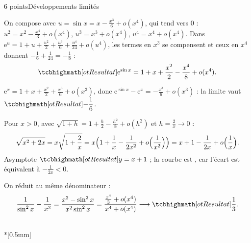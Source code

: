 

\begin{corrigeEval}{6 points}{Développements limités}
\begin{questions}
  \item On compose avec $u=\sin x=x-\frac{x^{3}}6+o(x^{4})$, qui tend vers
    $0$ : $u^{2}=x^{2}-\frac{x^{4}}3+o(x^{4})$, $u^{3}=x^{3}+o(x^{4})$,
    $u^{4}=x^{4}+o(x^{4})$. Dans
    $\mathrm{e}^{u}=1+u+\frac{u^{2}}2+\frac{u^{3}}6+\frac{u^{4}}{24}+o(u^{4})$,
    les termes en $x^{3}$ se compensent et ceux en $x^{4}$ donnent
    $-\frac16+\frac1{24}=-\frac18$ :
    \[\res{\mathrm{e}^{\sin x}=1+x+\frac{x^{2}}{2}-\frac{x^{4}}{8}+o(x^{4})}.\]
  \item $\mathrm{e}^{x}=1+x+\frac{x^{2}}2+\frac{x^{3}}6+o(x^{3})$, donc
    $\mathrm{e}^{\sin x}-\mathrm{e}^{x}=-\frac{x^{3}}6+o(x^{3})$ : la limite
    vaut $\res{-\dfrac16}$. \pts{1 pt}
  \item Pour $x>0$, avec $\sqrt{1+h}=1+\frac h2-\frac{h^{2}}8+o(h^{2})$ et
    $h=\frac2x\to0$ :
    \[\sqrt{x^{2}+2x}=x\sqrt{1+\frac2x}
      =x\Bigl(1+\frac1x-\frac{1}{2x^{2}}+o\Bigl(\frac{1}{x^{2}}\Bigr)\Bigr)
      =x+1-\frac{1}{2x}+o\Bigl(\frac1x\Bigr).\]
    Asymptote $\res{y=x+1}$ ; la courbe est , car
    l'écart est équivalent à $-\frac{1}{2x}<0$. 
  \item On réduit au même dénominateur :
    \[\frac{1}{\sin^{2}x}-\frac1{x^{2}}=\frac{x^{2}-\sin^{2}x}{x^{2}\sin^{2}x}
      =\frac{\frac{x^{4}}{3}+o(x^{4})}{x^{4}+o(x^{4})}\longrightarrow\res{\frac13}.\]
\end{questions}
\begin{center}\begin{minipage}{\linewidth}\centering
{}\\*[0.5mm]
\end{minipage}\end{center}
\end{corrigeEval}

